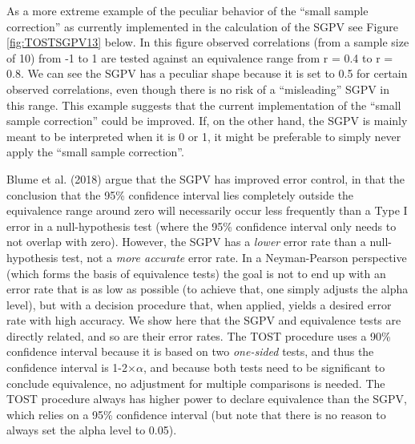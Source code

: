\documentclass[,man,floatsintext]{apa6}
\begin{document}
As a more extreme example of the peculiar behavior of the \enquote{small sample correction} as currently implemented in the calculation of the SGPV see Figure \ref{fig:TOSTSGPV13} below. In this figure observed correlations (from a sample size of 10) from -1 to 1 are tested against an equivalence range from r = 0.4 to r = 0.8. We can see the SGPV has a peculiar shape because it is set to 0.5 for certain observed correlations, even though there is no risk of a \enquote{misleading} SGPV in this range. This example suggests that the current implementation of the \enquote{small sample correction} could be improved. If, on the other hand, the SGPV is mainly meant to be interpreted when it is 0 or 1, it might be preferable to simply never apply the \enquote{small sample correction}.

Blume et al. (2018) argue that the SGPV has improved error control, in that the conclusion that the 95\% confidence interval lies completely outside the equivalence range around zero will necessarily occur less frequently than a Type I error in a null-hypothesis test (where the 95\% confidence interval only needs to not overlap with zero). However, the SGPV has a \emph{lower} error rate than a null-hypothesis test, not a \emph{more accurate} error rate. In a Neyman-Pearson perspective (which forms the basis of equivalence tests) the goal is not to end up with an error rate that is as low as possible (to achieve that, one simply adjusts the alpha level), but with a decision procedure that, when applied, yields a desired error rate with high accuracy. We show here that the SGPV and equivalence tests are directly related, and so are their error rates. The TOST procedure uses a 90\% confidence interval because it is based on two \emph{one-sided} tests, and thus the confidence interval is 1-2\(\times\)\(\alpha\), and because both tests need to be significant to conclude equivalence, no adjustment for multiple comparisons is needed. The TOST procedure always has higher power to declare equivalence than the SGPV, which relies on a 95\% confidence interval (but note that there is no reason to always set the alpha level to 0.05).
\end{document}
